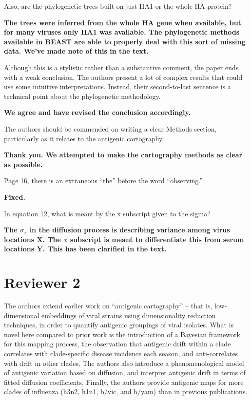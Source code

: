 \documentclass[11pt,oneside,letterpaper]{article}
\begin{document}
Also, are the phylogenetic trees built on just HA1 or the whole HA protein?

\textbf{The trees were inferred from the whole HA gene when available, but for many viruses only HA1 was available.  The phylogenetic methods available in BEAST are able to properly deal with this sort of missing data.  We've made note of this in the text.}

Although this is a stylistic rather than a substantive comment, the paper ends with a weak conclusion. The authors present a lot of complex results that could use some intuitive interpretations. Instead, their second-to-last sentence is a technical point about the phylogenetic methodology.

\textbf{We agree and have revised the conclusion accordingly.}

The authors should be commended on writing a clear Methods section, particularly as it relates to the antigenic cartography.

\textbf{Thank you. We attempted to make the cartography methods as clear as possible.}

Page 16, there is an extraneous ``the'' before the word ``observing.''

\textbf{Fixed.}

In equation 12, what is meant by the x subscript given to the sigma?

\textbf{The $\sigma_x$ in the diffusion process is describing variance among virus locations $\mathbf{X}$.  The $x$ subscript is meant to differentiate this from serum locations $\mathbf{Y}$.  This has been clarified in the text.}

\section*{Reviewer 2}

The authors extend earlier work on ``antigenic cartography'' -- that is, low-dimensional embeddings of viral strains using dimensionality reduction techniques, in order to quantify antigenic groupings of viral isolates. What is novel here compared to prior work is the introduction of a Bayesian framework for this mapping process, the observation that antigenic drift within a clade correlates with clade-specific disease incidence each season, and anti-correlates with drift in other clades. The authors also introduce a phenomenological model of antigenic variation based on diffusion, and interpret antigenic drift in terms of fitted diffusion coefficients. Finally, the authors provide antigenic maps for more clades of influenza (h3n2, h1n1, b/vic, and b/yam) than in previous publications.
\end{document}
